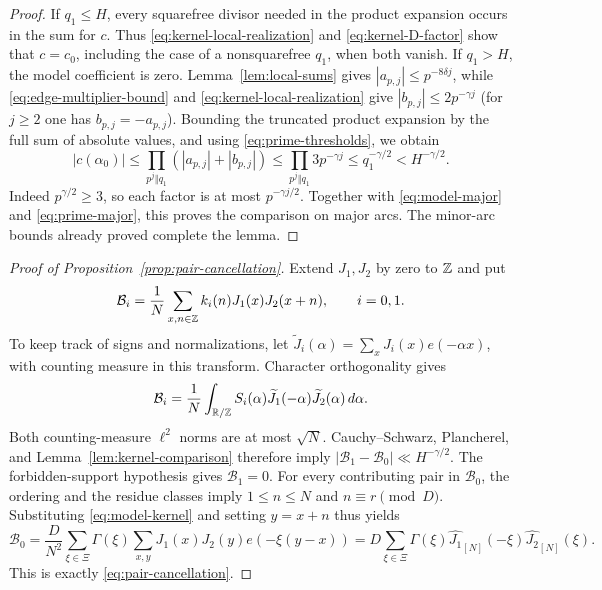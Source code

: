 \begin{proof}
If $q_1\le H$, every squarefree divisor needed in the product expansion
occurs in the sum for $c$.  Thus \eqref{eq:kernel-local-realization}
and \eqref{eq:kernel-D-factor} show that $c=c_0$, including the case of
a nonsquarefree $q_1$, when both vanish.  If $q_1>H$, the model
coefficient is zero.  Lemma~\ref{lem:local-sums} gives
$|a_{p,j}|\le p^{-8\delta j}$, while
\eqref{eq:edge-multiplier-bound} and
\eqref{eq:kernel-local-realization} give
$|b_{p,j}|\le2p^{-\gamma j}$ (for $j\ge2$ one has $b_{p,j}=-a_{p,j}$).
Bounding the truncated product expansion by the full sum of absolute
values, and using \eqref{eq:prime-thresholds}, we obtain
\[
 |c(\alpha_0)|\le
 \prod_{p^j\Vert q_1}(|a_{p,j}|+|b_{p,j}|)
 \le\prod_{p^j\Vert q_1}3p^{-\gamma j}
 \le q_1^{-\gamma/2}<H^{-\gamma/2}.
\]
Indeed $p^{\gamma/2}\ge3$, so each factor is at most
$p^{-\gamma j/2}$.  Together with \eqref{eq:model-major} and
\eqref{eq:prime-major}, this proves the comparison on major arcs.
The minor-arc bounds already proved complete the lemma.
\end{proof}

\begin{proof}[Proof of Proposition~\ref{prop:pair-cancellation}]
Extend $J_1,J_2$ by zero to $\mathbb Z$ and put
\[
 \mathcal B_i=\frac1N\sum_{x,n\in\mathbb Z}
                    k_i(n)J_1(x)J_2(x+n),\qquad i=0,1.
\]
To keep track of signs and normalizations, let
$\widetilde J_i(\alpha)=\sum_xJ_i(x)e(-\alpha x)$, with counting
measure in this transform.  Character orthogonality gives
\[
 \mathcal B_i=\frac1N\int_{\mathbb R/\mathbb Z}
 S_i(\alpha)\widetilde J_1(-\alpha)
                 \widetilde J_2(\alpha)\,d\alpha.
\]
Both counting-measure $\ell^2$ norms are at most $\sqrt N$.
Cauchy--Schwarz, Plancherel, and Lemma~\ref{lem:kernel-comparison}
therefore imply
$|\mathcal B_1-\mathcal B_0|\ll H^{-\gamma/2}$.
The forbidden-support hypothesis gives $\mathcal B_1=0$.
For every contributing pair in $\mathcal B_0$, the ordering and the
residue classes imply $1\le n\le N$ and $n\equiv r\pmod D$.
Substituting \eqref{eq:model-kernel} and setting $y=x+n$ thus yields
\[
 \mathcal B_0=\frac{D}{N^2}\sum_{\xi\in\Xi}\Gamma(\xi)
       \sum_{x,y}J_1(x)J_2(y)e(-\xi(y-x))
 =D\sum_{\xi\in\Xi}\Gamma(\xi)
       \widehat{J_1}_{[N]}(-\xi)\widehat{J_2}_{[N]}(\xi).
\]
This is exactly \eqref{eq:pair-cancellation}.
\end{proof}
